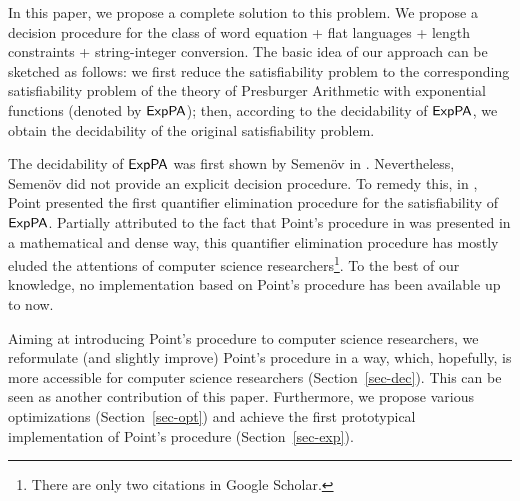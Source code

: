 In this paper, we propose a complete solution to this problem.
We propose a decision procedure for the class of word equation + flat languages + length constraints + string-integer conversion.
The basic idea of our approach can be sketched as follows: we first reduce the satisfiability problem to the corresponding satisfiability problem of the theory of Presburger Arithmetic with exponential functions (denoted by ${\sf ExpPA}$); then, according to the decidability of ${\sf ExpPA}$, we obtain the decidability of the original satisfiability problem.  

The decidability of ${\sf ExpPA}$ was first shown by Semen\"{o}v in \cite{Semenov84}. Nevertheless, Semen\"{o}v did not provide an explicit decision procedure. To remedy this, in \cite{Point86}, Point presented the first quantifier elimination procedure for the satisfiability of ${\sf ExpPA}$. Partially attributed to the fact that Point's procedure in \cite{Point86} was presented  in a mathematical and dense way, this quantifier elimination procedure has mostly eluded the attentions of computer science researchers\footnote{There are only two citations in Google Scholar.}.  To the best of our knowledge, no implementation based on Point's procedure has been available up to now. 

Aiming at introducing Point's procedure to computer science researchers, we reformulate (and slightly improve) Point's procedure in a way, which, hopefully, is more accessible for computer science researchers (Section~\ref{sec-dec}). This can be seen as another contribution of this paper.
Furthermore, we propose various optimizations (Section~\ref{sec-opt}) and achieve the first prototypical implementation of Point's procedure (Section~\ref{sec-exp}). 

